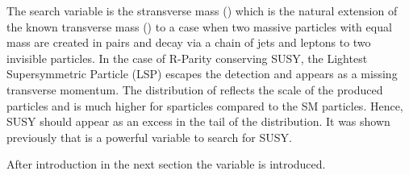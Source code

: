 The search variable is the stransverse mass (\mttwo) which is the natural extension of the known transverse mass (\mt) to a case 
when two massive particles with equal mass are created in pairs and decay via a chain of jets and leptons to two 
invisible particles. 
In the case of R-Parity conserving SUSY, the Lightest Supersymmetric Particle (LSP) escapes the detection and appears as 
a missing transverse momentum.
The distribution of \mttwo reflects the scale of the produced particles and is much higher for sparticles
compared to the SM particles. Hence, SUSY should appear as an excess in the tail of the \mttwo distribution.
It was shown previously \cite{MT2_2011} that \mttwo is a powerful variable to search for SUSY. 


After introduction in the next section the \mttwo variable is introduced. 




